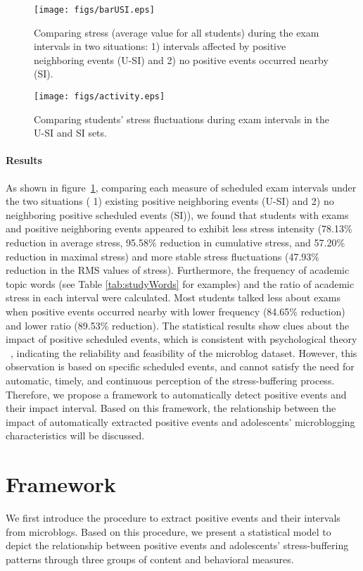 \documentclass[5p,times,numbers,authoryear]{elsarticle}
\begin{document}
\begin{figure}[h]
\centering
\texttt{[image: figs/barUSI.eps]}
\caption{\small{Comparing stress (average value for all students) during the exam intervals in two situations:
1) intervals affected by positive neighboring events (U-SI) and 2) no positive events occurred nearby (SI).}}
\label{fig:frequencyBar}
\end{figure}

\begin{figure}[h]
\centering
\texttt{[image: figs/activity.eps]}
\caption{\small{Comparing students' stress fluctuations during exam intervals in the U-SI and SI sets. }}
\label{fig:frequency}
\end{figure}

\paragraph{Results}
As shown in figure~\ref{fig:frequencyBar}, comparing each measure of scheduled exam intervals under the two situations (
1) existing positive neighboring events (U-SI) and 2) no neighboring positive scheduled events (SI)), we found that students with exams and positive neighboring events appeared to exhibit less stress intensity (78.13\% reduction in average stress, 95.58\% reduction in cumulative stress, and 57.20\% reduction in maximal stress) and more stable stress fluctuations (47.93\% reduction in the RMS values of stress).
Furthermore, the frequency of academic topic words (see Table \ref{tab:studyWords} for examples) and the ratio of academic stress in each interval were calculated.
Most students talked less about exams when positive events occurred nearby 
with lower frequency (84.65\% reduction) and lower ratio (89.53\% reduction).
The statistical results show clues about the impact of positive scheduled events,
which is consistent with psychological theory ~\citep{Cohen1984Positive, Cohen2010Positive, Needles1990Positive}, indicating the reliability and feasibility of the microblog dataset.
However, this observation is based on specific scheduled events,
and cannot satisfy the need for automatic, timely, and continuous perception of the stress-buffering process.
Therefore, we propose a framework to automatically detect positive events and their impact interval.
Based on this framework, the relationship between the impact of automatically extracted positive events and adolescents' microblogging characteristics will be discussed.


\section{Framework}
\label{sec:frame}
We first introduce the procedure to extract positive events and their intervals from microblogs.
Based on this procedure, we present a statistical model to depict the relationship between positive events and adolescents' stress-buffering patterns through three groups of content and behavioral measures.
\end{document}

